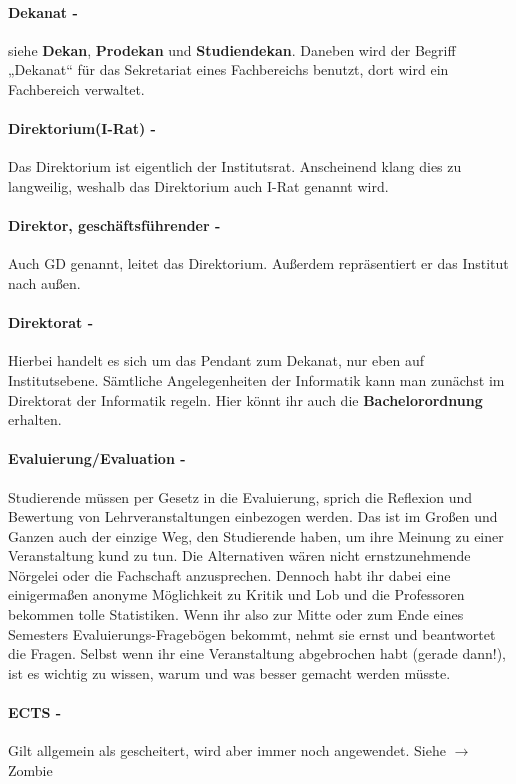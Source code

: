 \paragraph{Dekanat -} siehe \textbf{Dekan}, \textbf{Prodekan} und \textbf{Studiendekan}. Daneben wird der Begriff „Dekanat“ für das Sekretariat eines Fachbereichs benutzt, dort wird ein Fachbereich verwaltet.
\paragraph{Direktorium(I-Rat) -} Das Direktorium ist eigentlich der Institutsrat. Anscheinend klang dies zu langweilig, weshalb das Direktorium auch I-Rat genannt wird.
\paragraph{Direktor, geschäftsführender -} Auch GD genannt, leitet das Direktorium. Außerdem repräsentiert er das Institut nach außen.
\paragraph{Direktorat -}  Hierbei handelt es sich um das Pendant zum Dekanat, nur eben auf In\-sti\-tuts\-ebe\-ne. Sämtliche Angelegenheiten der Informatik kann man zunächst im Direktorat der Informatik regeln. Hier könnt ihr auch die \textbf{Bachelorordnung} erhalten.
\paragraph{Evaluierung/Evaluation -} Studierende müssen per Gesetz in die Evaluierung, sprich die Reflexion und Bewertung von Lehrveranstaltungen einbezogen werden. Das ist im Großen und Ganzen auch der einzige Weg, den Studierende haben, um ihre Meinung zu einer Veranstaltung kund zu tun. Die Alternativen wären nicht ernstzunehmende Nörgelei oder die Fachschaft anzusprechen. Dennoch habt ihr dabei eine einigermaßen anonyme Möglichkeit zu Kritik und Lob und die Professoren bekommen tolle Statistiken. Wenn ihr also zur Mitte  oder zum Ende eines Semesters Evaluierungs-Fragebögen bekommt, nehmt sie ernst und beantwortet die Fragen. Selbst wenn ihr eine Veranstaltung abgebrochen habt (gerade dann!), ist es wichtig zu wissen, warum und was besser gemacht werden müsste.
\paragraph{ECTS -} Gilt allgemein als gescheitert, wird aber immer noch angewendet. Siehe $ \rightarrow $Zombie
